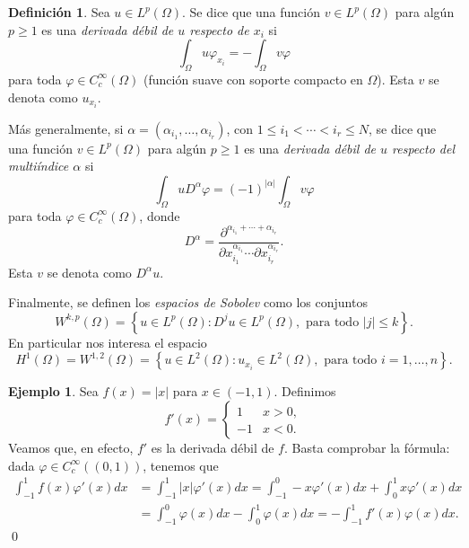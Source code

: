 \documentclass[12pt,a4paper]{book}
\theoremstyle{definition} \newtheorem{defn}[thm]{Definición}
\theoremstyle{definition} \newtheorem{ejemplo}[thm]{Ejemplo}
\theoremstyle{definition} \newtheorem{ejercicio}[thm]{Ejercicio}
\theoremstyle{remark} \newtheorem*{obs}{Observación}
\begin{document}
\begin{defn}
  Sea $u\in L^p(\Omega)$. Se dice que una función $v\in L^p(\Omega)$ para algún $p\geq 1$ es una \emph{derivada débil de $u$ respecto de $x_i$} si 
  \begin{equation*}
    \int_\Omega u \varphi_{x_i}= -\int_{\Omega} v \varphi
  \end{equation*}
  para toda $\varphi\in C^{\infty}_c(\Omega)$ (función suave con soporte compacto en $\Omega$). Esta $v$ se denota como $u_{x_i}$.

  Más generalmente, si $\alpha=(\alpha_{i_1},\dots,\alpha_{i_r})$, con $1\leq i_1 <\cdots < i_r \leq N$, se dice que una función $v\in L^p(\Omega)$ para algún $p\geq 1$ es una \emph{derivada débil de $u$ respecto del multiíndice $\alpha$}  si
  \begin{equation*}
    \int_{\Omega} u D^{\alpha} \varphi = (-1)^{|\alpha|} \int_{\Omega} v \varphi
  \end{equation*}
  para toda $\varphi \in C^{\infty}_c(\Omega)$, donde 
  \begin{equation*}
    D^{\alpha}=\frac{\partial^{\alpha_{i_1}+\cdots +\alpha_{i_r}}}{\partial x_{i_1}^{\alpha_{i_1}}\cdots \partial x_{i_r}^{\alpha_{i_r}}}.
  \end{equation*}
  Esta $v$ se denota como $D^\alpha u$.

  Finalmente, se definen los \emph{espacios de Sobolev} como los conjuntos
  \begin{equation*}
    W^{k,p}(\Omega)=\left\{ u \in L^p(\Omega): D^j u \in L^p(\Omega), \text{ para todo } |j|\leq k  \right\}.
  \end{equation*}
  En particular nos interesa el espacio
  \begin{equation*}
    H^1(\Omega)=W^{1,2}(\Omega)=\left\{ u \in L^2(\Omega) : u_{x_i} \in L^2(\Omega), \text{ para todo } i=1,\dots,n \right\}.
  \end{equation*}
\end{defn}

\begin{ejemplo}
  Sea $f(x)=|x|$ para $x\in (-1,1)$. Definimos
  \begin{equation*}
    f'(x)=
    \begin{cases}
      1 & x >0, \\
      -1 & x<0.
    \end{cases}
  \end{equation*}
  Veamos que, en efecto, $f'$ es la derivada débil de $f$. Basta comprobar la fórmula: dada $\varphi \in C^{\infty}_c((0,1))$, tenemos que
  \begin{align*}
    \int_{-1}^1 f(x) \varphi'(x) dx & = \int_{-1}^1 |x| \varphi'(x) dx = \int_{-1}^0 -x\varphi'(x) dx + \int_0^1 x \varphi'(x) dx \\ & = \int_{-1}^0 \varphi(x) dx - \int_0^1 \varphi(x) dx = -\int_{-1}^1 f'(x) \varphi(x) dx.
  \end{align*}
  \qed
\end{ejemplo}
\end{document}
